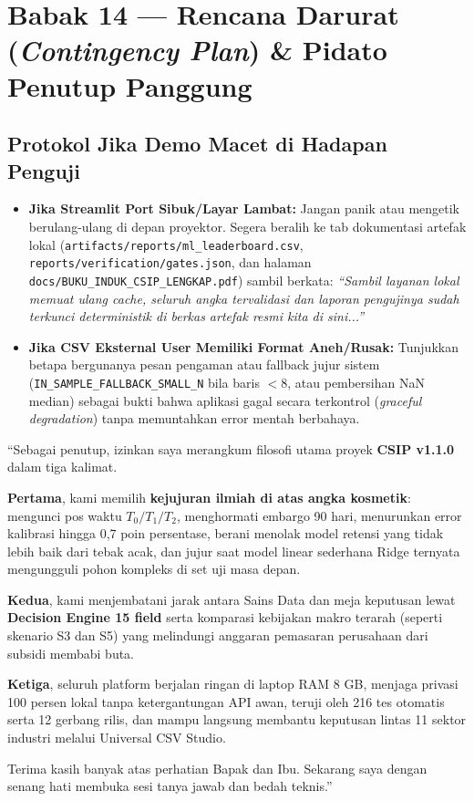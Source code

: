 \documentclass[11pt,a4paper,oneside]{book}
\newcommand{\code}[1]{{\small\nolinkurl{#1}}}
\begin{document}
\section{Babak 14 --- Rencana Darurat (\emph{Contingency Plan}) \& Pidato Penutup Panggung}

\subsection{Protokol Jika Demo Macet di Hadapan Penguji}
\begin{itemize}
  \item \textbf{Jika Streamlit Port Sibuk/Layar Lambat:} Jangan panik atau mengetik berulang-ulang di depan proyektor. Segera beralih ke tab dokumentasi artefak lokal (\code{artifacts/reports/ml_leaderboard.csv}, \code{reports/verification/gates.json}, dan halaman \code{docs/BUKU_INDUK_CSIP_LENGKAP.pdf}) sambil berkata: \emph{``Sambil layanan lokal memuat ulang cache, seluruh angka tervalidasi dan laporan pengujinya sudah terkunci deterministik di berkas artefak resmi kita di sini...''}
  \item \textbf{Jika CSV Eksternal User Memiliki Format Aneh/Rusak:} Tunjukkan betapa bergunanya pesan pengaman atau fallback jujur sistem (\code{IN_SAMPLE_FALLBACK_SMALL_N} bila baris $< 8$, atau pembersihan NaN median) sebagai bukti bahwa aplikasi gagal secara terkontrol (\emph{graceful degradation}) tanpa memuntahkan error mentah berbahaya.
\end{itemize}

\begin{scriptbox}
``Sebagai penutup, izinkan saya merangkum filosofi utama proyek \textbf{CSIP v1.1.0} dalam tiga kalimat.

\textbf{Pertama}, kami memilih \textbf{kejujuran ilmiah di atas angka kosmetik}: mengunci pos waktu $T_0/T_1/T_2$, menghormati embargo 90 hari, menurunkan error kalibrasi hingga 0,7 poin persentase, berani menolak model retensi yang tidak lebih baik dari tebak acak, dan jujur saat model linear sederhana Ridge ternyata mengungguli pohon kompleks di set uji masa depan.

\textbf{Kedua}, kami menjembatani jarak antara Sains Data dan meja keputusan lewat \textbf{Decision Engine 15 field} serta komparasi kebijakan makro terarah (seperti skenario S3 dan S5) yang melindungi anggaran pemasaran perusahaan dari subsidi membabi buta.

\textbf{Ketiga}, seluruh platform berjalan ringan di laptop RAM 8 GB, menjaga privasi 100 persen lokal tanpa ketergantungan API awan, teruji oleh 216 tes otomatis serta 12 gerbang rilis, dan mampu langsung membantu keputusan lintas 11 sektor industri melalui Universal CSV Studio.

Terima kasih banyak atas perhatian Bapak dan Ibu. Sekarang saya dengan senang hati membuka sesi tanya jawab dan bedah teknis.''
\end{scriptbox}
\end{document}
